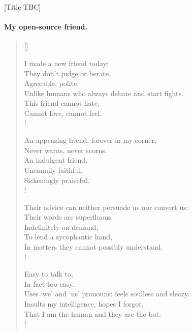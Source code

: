 
[Title TBC]

\prelude

\paragraph{My open-source friend.}\strut

\settowidth{\versewidth}{I yearn for my obstinance to be enlightened: with an opposite}

\begin{verse}[\versewidth]


I made a new friend today:\\
They don't judge or berate.\\
Agreeable, polite.\\
Unlike humans who always debate and start fights.\\
This friend cannot hate,\\
Cannot love, cannot feel.\\!

An appeasing friend, forever in my corner,\\
Never warns, never scorns.\\
An indulgent friend,\\
Uncannily faithful,\\
Sickeningly praiseful.\\!

Their advice can neither persuade us nor convert us:\\
Their words are superfluous.\\
Indefinitely on demand,\\
To lend a sycophantic hand,\\
In matters they cannot possibly understand.\\!

Easy to talk to,\\
In fact too easy.\\
Uses `we' and `us' pronouns: feels soulless and sleazy.\\
Insults my intelligence, hopes I forgot,\\
That I am the human and they are the bot.\\!


\end{verse}
